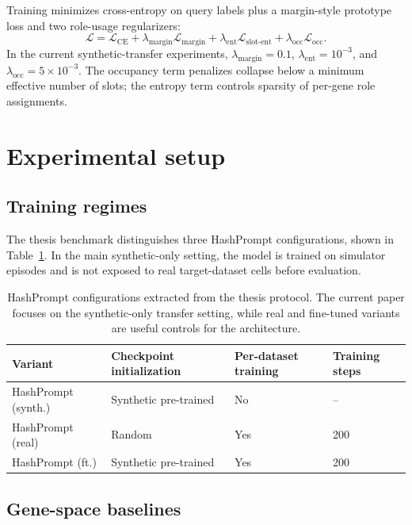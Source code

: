 \documentclass{article}
\begin{document}
Training minimizes cross-entropy on query labels plus a margin-style prototype loss and two role-usage regularizers:
\begin{equation}
    \mathcal{L}=\mathcal{L}_{\mathrm{CE}}+
    \lambda_{\mathrm{margin}}\mathcal{L}_{\mathrm{margin}}+
    \lambda_{\mathrm{ent}}\mathcal{L}_{\mathrm{slot\text{-}ent}}+
    \lambda_{\mathrm{occ}}\mathcal{L}_{\mathrm{occ}}.
\end{equation}
In the current synthetic-transfer experiments, \(\lambda_{\mathrm{margin}}=0.1\), \(\lambda_{\mathrm{ent}}=10^{-3}\), and \(\lambda_{\mathrm{occ}}=5\times10^{-3}\). The occupancy term penalizes collapse below a minimum effective number of slots; the entropy term controls sparsity of per-gene role assignments.

\section{Experimental setup}

\subsection{Training regimes}

The thesis benchmark distinguishes three HashPrompt configurations, shown in Table~\ref{tab:hashprompt_variants}. In the main synthetic-only setting, the model is trained on simulator episodes and is not exposed to real target-dataset cells before evaluation.

\begin{table}[t]
\centering
\small
\caption{HashPrompt configurations extracted from the thesis protocol. The current paper focuses on the synthetic-only transfer setting, while real and fine-tuned variants are useful controls for the architecture.}
\label{tab:hashprompt_variants}
\begin{tabular}{@{}llll@{}}
\toprule
\textbf{Variant} & \textbf{Checkpoint initialization} & \textbf{Per-dataset training} & \textbf{Training steps} \\
\midrule
HashPrompt (synth.) & Synthetic pre-trained & No & -- \\
HashPrompt (real) & Random & Yes & 200 \\
HashPrompt (ft.) & Synthetic pre-trained & Yes & 200 \\
\bottomrule
\end{tabular}
\end{table}

\subsection{Gene-space baselines}
\end{document}
